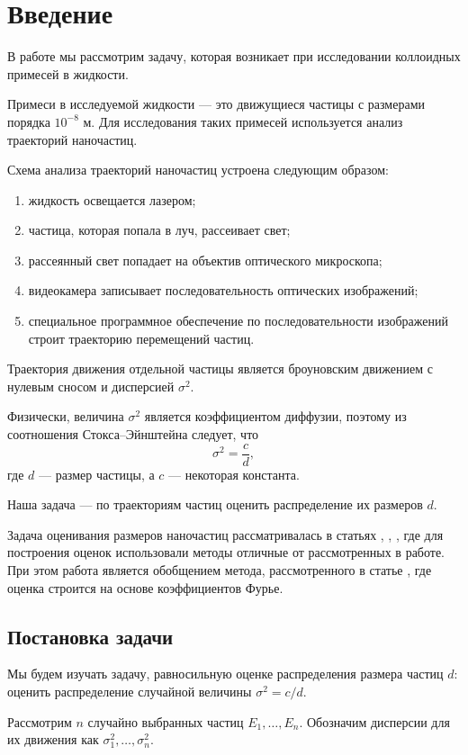 \documentclass[../paper.tex]{subfiles}
\begin{document}
\section{Введение}
В работе мы рассмотрим задачу, которая возникает при исследовании коллоидных примесей в жидкости.

Примеси в исследуемой жидкости --- это движущиеся частицы с размерами порядка $10^{-8}$ м.
Для исследования таких примесей используется анализ траекторий наночастиц.

Схема анализа траекторий наночастиц устроена следующим образом:
\begin{enumerate}
	\item жидкость освещается лазером;
	\item частица, которая попала в луч, рассеивает свет;
	\item рассеянный свет попадает на объектив оптического микроскопа;
	\item видеокамера записывает последовательность оптических изображений;
	\item специальное программное обеспечение по последовательности изображений строит траекторию перемещений частиц.
\end{enumerate}

Траектория движения отдельной частицы является броуновским движением с нулевым сносом и дисперсией $\sigma^2$.

Физически, величина $\sigma^2$ является коэффициентом диффузии, поэтому из соотношения Стокса--Эйнштейна следует, что
\[
	\sigma^2 = \frac{c}{d}
,\] где $d$ --- размер частицы, а $c$ --- некоторая константа.

Наша задача ---  по траекториям частиц оценить распределение их размеров $d$.

Задача оценивания размеров наночастиц рассматривалась 
в статьях \cite{Wagner2014}, \cite{Matsuura2018}, \cite{fourier-estimation},
где для построения оценок использовали методы отличные от рассмотренных в работе.
При этом работа является обобщением метода, рассмотренного в статье \cite{fourier-estimation}, где оценка строится на основе коэффициентов Фурье.
\subsection{Постановка задачи}
Мы будем изучать задачу, равносильную оценке распределения размера частиц $d$: оценить распределение случайной величины $\sigma^2 = c/d$.

Рассмотрим $n$ случайно выбранных частиц $E_1, \dots, E_n$. 
Обозначим дисперсии для их движения как $\sigma_1^2, \dots, \sigma_n^2$. 
\end{document}
